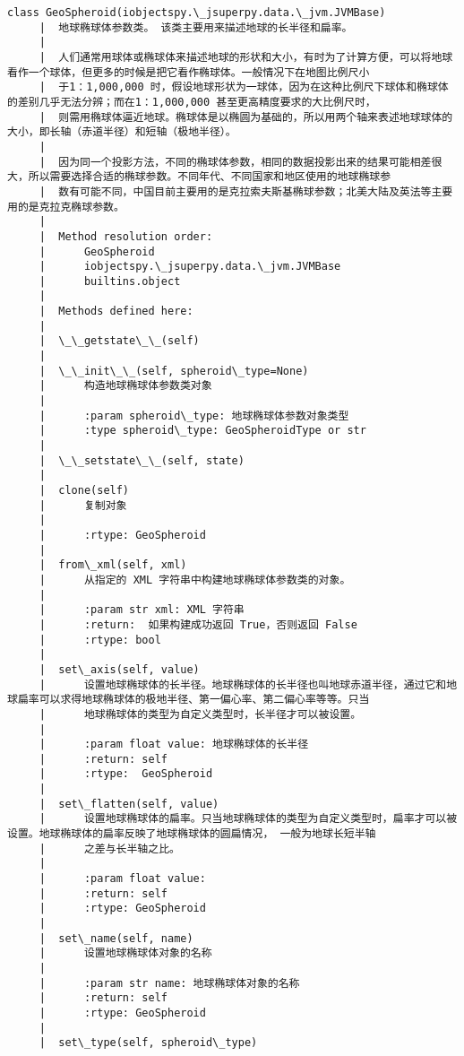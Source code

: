 \documentclass[11pt]{article}
\begin{document}
\begin{Verbatim}[commandchars=\\\{\}]
    class GeoSpheroid(iobjectspy.\_jsuperpy.data.\_jvm.JVMBase)
     |  地球椭球体参数类。 该类主要用来描述地球的长半径和扁率。
     |  
     |  人们通常用球体或椭球体来描述地球的形状和大小，有时为了计算方便，可以将地球看作一个球体，但更多的时候是把它看作椭球体。一般情况下在地图比例尺小
     |  于1：1,000,000 时，假设地球形状为一球体，因为在这种比例尺下球体和椭球体的差别几乎无法分辨；而在1：1,000,000 甚至更高精度要求的大比例尺时，
     |  则需用椭球体逼近地球。椭球体是以椭圆为基础的，所以用两个轴来表述地球球体的大小，即长轴（赤道半径）和短轴（极地半径）。
     |  
     |  因为同一个投影方法，不同的椭球体参数，相同的数据投影出来的结果可能相差很大，所以需要选择合适的椭球参数。不同年代、不同国家和地区使用的地球椭球参
     |  数有可能不同，中国目前主要用的是克拉索夫斯基椭球参数；北美大陆及英法等主要用的是克拉克椭球参数。
     |  
     |  Method resolution order:
     |      GeoSpheroid
     |      iobjectspy.\_jsuperpy.data.\_jvm.JVMBase
     |      builtins.object
     |  
     |  Methods defined here:
     |  
     |  \_\_getstate\_\_(self)
     |  
     |  \_\_init\_\_(self, spheroid\_type=None)
     |      构造地球椭球体参数类对象
     |      
     |      :param spheroid\_type: 地球椭球体参数对象类型
     |      :type spheroid\_type: GeoSpheroidType or str
     |  
     |  \_\_setstate\_\_(self, state)
     |  
     |  clone(self)
     |      复制对象
     |      
     |      :rtype: GeoSpheroid
     |  
     |  from\_xml(self, xml)
     |      从指定的 XML 字符串中构建地球椭球体参数类的对象。
     |      
     |      :param str xml: XML 字符串
     |      :return:  如果构建成功返回 True，否则返回 False
     |      :rtype: bool
     |  
     |  set\_axis(self, value)
     |      设置地球椭球体的长半径。地球椭球体的长半径也叫地球赤道半径，通过它和地球扁率可以求得地球椭球体的极地半径、第一偏心率、第二偏心率等等。只当
     |      地球椭球体的类型为自定义类型时，长半径才可以被设置。
     |      
     |      :param float value: 地球椭球体的长半径
     |      :return: self
     |      :rtype:  GeoSpheroid
     |  
     |  set\_flatten(self, value)
     |      设置地球椭球体的扁率。只当地球椭球体的类型为自定义类型时，扁率才可以被设置。地球椭球体的扁率反映了地球椭球体的圆扁情况， 一般为地球长短半轴
     |      之差与长半轴之比。
     |      
     |      :param float value:
     |      :return: self
     |      :rtype: GeoSpheroid
     |  
     |  set\_name(self, name)
     |      设置地球椭球体对象的名称
     |      
     |      :param str name: 地球椭球体对象的名称
     |      :return: self
     |      :rtype: GeoSpheroid
     |  
     |  set\_type(self, spheroid\_type)

\end{Verbatim}
\end{document}

